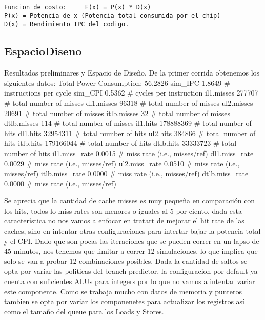 \documentclass[journal]{IEEEtran}
\begin{document}
\footnotesize \begin{verbatim}
Funcion de costo:     F(x) = P(x) * D(x)
P(x) = Potencia de x (Potencia total consumida por el chip)
D(x) = Rendimiento IPC del codigo.
\end{verbatim}
\normalsize

\subsection{EspacioDiseno}
Resultados preliminares y Espacio de Dise\~no.
De la primer corrida obtenemos los siguientes datos:
Total Power Consumption: 56.2826
sim\_IPC                      1.8649 # instructions per cycle
sim\_CPI                      0.5362 # cycles per instruction
il1.misses                   277707 # total number of misses
dl1.misses                    96318 # total number of misses
ul2.misses                    20691 # total number of misses
itlb.misses                      32 # total number of misses
dtlb.misses                     114 # total number of misses
il1.hits                  178888369 # total number of hits
dl1.hits                   32954311 # total number of hits
ul2.hits                     384866 # total number of hits
itlb.hits                 179166044 # total number of hits
dtlb.hits                  33333723 # total number of hits
il1.miss\_rate                0.0015 # miss rate (i.e., misses/ref)
dl1.miss\_rate                0.0029 # miss rate (i.e., misses/ref)
ul2.miss\_rate                0.0510 # miss rate (i.e., misses/ref)
itlb.miss\_rate               0.0000 # miss rate (i.e., misses/ref)
dtlb.miss\_rate               0.0000 # miss rate (i.e., misses/ref)

Se aprecia que la cantidad de cache misses es muy peque\~na en comparaci\'on con los hits, todos lo miss rates son menores o iguales al 5 por ciento, dada esta caracter\'istica no nos vamos a enfocar en tratart de mejorar el hit rate de las caches, sino en intentar otras configuraciones para intertar bajar la potencia total y el CPI.
Dado que son pocas las iteraciones que se pueden correr en un lapso de 45 minutos, nos tenemos que limitar a correr 12 simulaciones, lo que implica que solo se van a probar 12 combinaciones posibles.  Dada la cantidad de saltos se opta por variar las politicas del branch predictor, la configuracion por default ya cuenta con suficientes ALUs para integers por lo que no vamos a intentar variar este componente.  Como se trabaja mucho con datos de memoria y punteros tambien se opta por variar los componenetes para actualizar los registros as\'i como el tama\~no del queue para los Loads y Stores.
\end{document}
